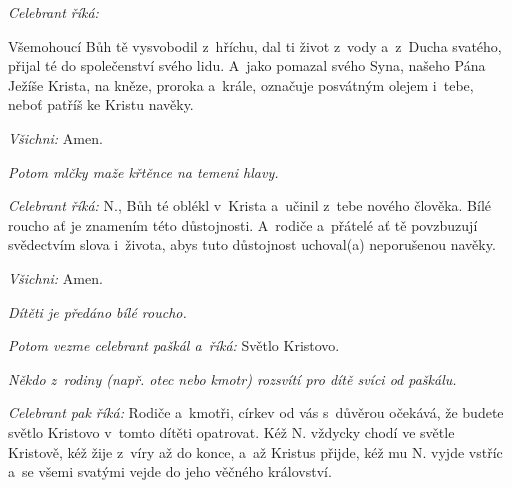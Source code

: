 \textit{Celebrant říká:}

Všemohoucí Bůh tě vysvobodil z~hříchu, dal ti život z~vody a~z~Ducha svatého,
přijal té do společenství svého lidu.
A~jako pomazal svého Syna, našeho Pána Ježíše Krista,
na kněze, proroka a~krále, označuje posvátným olejem i~tebe, neboť patříš ke Kristu navěky.

\textit{Všichni:} Amen.

\textit{Potom mlčky maže křtěnce na temeni hlavy.}

\pars{}

\textit{Celebrant říká:} {\color{red}N.}, Bůh té oblékl v~Krista a~učinil z~tebe nového člověka.
Bílé roucho ať je znamením této důstojnosti.
A~rodiče a~přátelé ať tě povzbuzují svědectvím slova i~života,
abys tuto důstojnost uchoval(a) neporušenou navěky.

\textit{Všichni:} Amen.

\textit{Dítěti je předáno bílé roucho.}

\pars{}

\textit{Potom vezme celebrant paškál a~říká:} Světlo Kristovo.

\textit{Někdo z~rodiny (např. otec nebo kmotr) rozsvítí pro dítě svíci od paškálu.}

\textit{Celebrant pak říká:} Rodiče a~kmotři, církev od vás s~důvěrou očekává, že budete světlo Kristovo v~tomto dítěti opatrovat.
Kéž {\color{red}N.} vždycky chodí ve světle Kristově, kéž žije z~víry až do konce, a~až Kristus přijde,
kéž mu {\color{red}N.} vyjde vstříc a~se všemi svatými vejde do jeho věčného království.

